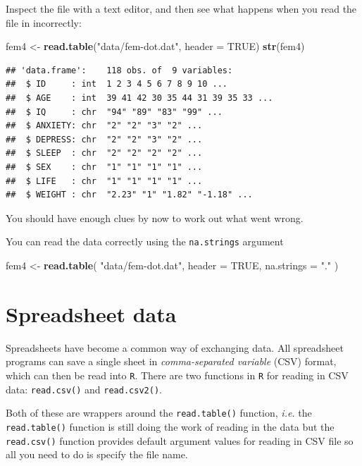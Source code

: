\documentclass[
]{book}
\newenvironment{Shaded}{\begin{snugshade}}{\end{snugshade}}
\newcommand{\AttributeTok}[1]{\textcolor[rgb]{0.13,0.29,0.53}{#1}}
\newcommand{\ConstantTok}[1]{\textcolor[rgb]{0.56,0.35,0.01}{#1}}
\newcommand{\FunctionTok}[1]{\textcolor[rgb]{0.13,0.29,0.53}{\textbf{#1}}}
\newcommand{\NormalTok}[1]{#1}
\newcommand{\OtherTok}[1]{\textcolor[rgb]{0.56,0.35,0.01}{#1}}
\newcommand{\StringTok}[1]{\textcolor[rgb]{0.31,0.60,0.02}{#1}}
\begin{document}
Inspect the file with a text editor, and then see what happens when
you read the file in incorrectly:

\begin{Shaded}
\begin{Highlighting}[]
\NormalTok{fem4 }\OtherTok{\textless{}{-}} \FunctionTok{read.table}\NormalTok{(}\StringTok{"data/fem{-}dot.dat"}\NormalTok{, }\AttributeTok{header =} \ConstantTok{TRUE}\NormalTok{)}
\FunctionTok{str}\NormalTok{(fem4)}
\end{Highlighting}
\end{Shaded}

\begin{verbatim}
## 'data.frame':    118 obs. of  9 variables:
##  $ ID     : int  1 2 3 4 5 6 7 8 9 10 ...
##  $ AGE    : int  39 41 42 30 35 44 31 39 35 33 ...
##  $ IQ     : chr  "94" "89" "83" "99" ...
##  $ ANXIETY: chr  "2" "2" "3" "2" ...
##  $ DEPRESS: chr  "2" "2" "3" "2" ...
##  $ SLEEP  : chr  "2" "2" "2" "2" ...
##  $ SEX    : chr  "1" "1" "1" "1" ...
##  $ LIFE   : chr  "1" "1" "1" "1" ...
##  $ WEIGHT : chr  "2.23" "1" "1.82" "-1.18" ...
\end{verbatim}

You should have enough clues by now to work out what went wrong.

You can read the data correctly using the \texttt{na.strings} argument

\begin{Shaded}
\begin{Highlighting}[]
\NormalTok{fem4 }\OtherTok{\textless{}{-}} 
  \FunctionTok{read.table}\NormalTok{(}
    \StringTok{"data/fem{-}dot.dat"}\NormalTok{, }
    \AttributeTok{header =} \ConstantTok{TRUE}\NormalTok{, }
    \AttributeTok{na.strings =} \StringTok{"."}
\NormalTok{  )}
\end{Highlighting}
\end{Shaded}

\section{Spreadsheet data}\label{spreadsheet-data}

Spreadsheets have become a common way of exchanging data. All
spreadsheet programs can save a single sheet in \emph{comma-separated
variable} (CSV) format, which can then be read into \texttt{R}. There
are two functions in \texttt{R} for reading in CSV data:
\texttt{read.csv()} and \texttt{read.csv2()}.

Both of these are wrappers around the \texttt{read.table()} function,
\emph{i.e.} the \texttt{read.table()} function is still doing the work
of reading in the data but the \texttt{read.csv()} function provides
default argument values for reading in CSV file so all you need to
do is specify the file name.
\end{document}
